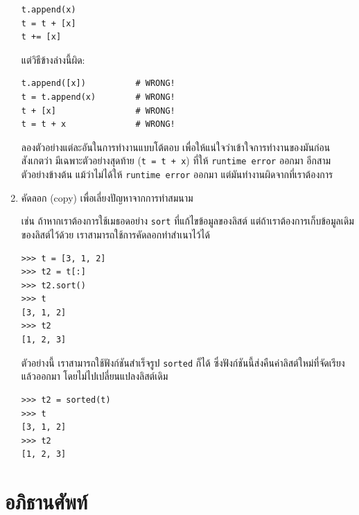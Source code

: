 \begin{enumerate}
\begin{verbatim}
t.append(x)
t = t + [x]
t += [x]
\end{verbatim}

แต่วิธีข้างล่างนี้ผิด:

\begin{verbatim}
t.append([x])          # WRONG!
t = t.append(x)        # WRONG!
t + [x]                # WRONG!
t = t + x              # WRONG!
\end{verbatim}

ลองตัวอย่างแต่ละอันในการทำงานแบบโต้ตอบ เพื่อให้แน่ใจว่าเข้าใจการทำงานของมันก่อน
สังเกตว่า มีเฉพาะตัวอย่างสุดท้าย (\verb|t = t + x|) ที่ให้ \texttt{runtime error} ออกมา
อีกสามตัวอย่างข้างต้น แม้ว่าไม่ได้ให้ \texttt{runtime error} ออกมา แต่มันทำงานผิดจากที่เราต้องการ

\item คัดลอก (copy) เพื่อเลี่ยงปัญหาจากการทำสมนาม

เช่น ถ้าหากเราต้องการใช้เมธอดอย่าง \texttt{sort} ที่แก้ไขข้อมูลของลิสต์
แต่ถ้าเราต้องการเก็บข้อมูลเดิมของลิสต์ไว้ด้วย
เราสามารถใช้การคัดลอกทำสำเนาไว้ได้

\begin{verbatim}
>>> t = [3, 1, 2]
>>> t2 = t[:]
>>> t2.sort()
>>> t
[3, 1, 2]
>>> t2
[1, 2, 3]
\end{verbatim}

ตัวอย่างนี้ เราสามารถใช้ฟังก์ชันสำเร็จรูป \texttt{sorted} ก็ได้
ซึ่งฟังก์ชันนี้ส่งคืนค่าลิสต์ใหม่ที่จัดเรียงแล้วออกมา โดยไม่ไปเปลี่ยนแปลงลิสต์เดิม

\begin{verbatim}
>>> t2 = sorted(t)
>>> t
[3, 1, 2]
>>> t2
[1, 2, 3]
\end{verbatim}

\end{enumerate}



\section{อภิธานศัพท์}

